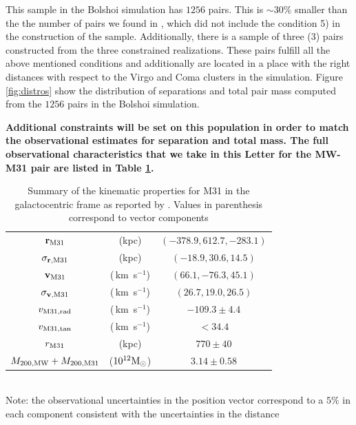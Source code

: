 \documentclass{emulateapj}
\newcommand{\kms}{\,km~s$^{-1}$}
\newcommand{\Msun}{{\ifmmode{{\rm {M_{\odot}}}}\else{${\rm{M_{\odot}}}$}\fi}}
\begin{document}
This sample in the Bolshoi simulation has $1256$ pairs. This is $\sim 30\%$ smaller than the the number of pairs we found in \cite{ForeroRomero2011}, which did not include the condition 5) in the construction of the sample. Additionally, there is a sample of three (3) pairs constructed from the three constrained realizations. These pairs fulfill all the above mentioned conditions and additionally are located in a place with the right distances with respect to the Virgo and Coma clusters in the simulation. Figure \ref{fig:distros} show the distribution of separations and total pair mass computed from the $1256$ pairs in the Bolshoi simulation. 

{\bf Additional constraints will be set on this population in order to match the observational estimates for separation and total mass. The full observational characteristics that we take in this Letter for the MW-M31 pair are listed in Table \ref{table:1}.}



\begin{table}
\caption{Summary of the kinematic properties for M31 in the galactocentric frame as reported by \citep{vanderMarel12}. Values in parenthesis correspond to vector components}
\begin{center}
\begin{tabular}{ccc}\hline\hline
${\bf r}_{\rm M31}$ & (kpc) &$(-378.9, 612.7, -283.1)$\\
$\sigma_{{\bf r}, {\rm M31}}$ & (kpc) &$(-18.9, 30.6, 14.5)$\\
${\bf v}_{\rm M31}$ & (\kms) & $(66.1, -76.3, 45.1)$\\
$\sigma_{{\bf v},{\rm M31}}$ & (\kms) &$(26.7, 19.0, 26.5)$\\
$v_{\rm M31,rad}$ &(\kms) & $-109.3\pm 4.4$\\
$v_{\rm M31,tan}$ &(\kms) & $<34.4$\\
$r_{\rm M31}$ &(kpc) & $770\pm 40$\\
$M_{\rm 200,MW} + M_{\rm 200, M31}$ & ($10^{12}\Msun$) & $3.14\pm 0.58$\\\hline
\end{tabular}\\
\vspace{1mm}
Note: the observational uncertainties in the position vector correspond to a $5\%$ in each component consistent with the uncertainties in the distance \citep[see references in][]{vanderMarel08}
\end{center}
\label{table:1}
\end{table}
\end{document}
